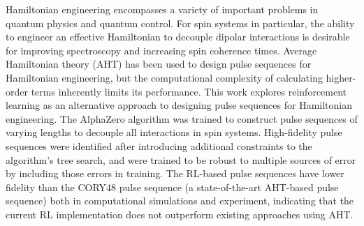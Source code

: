 

%
%
%
Hamiltonian engineering encompasses a variety of important problems in quantum physics and quantum control. For spin systems in particular, the ability to engineer an effective Hamiltonian to decouple dipolar interactions is desirable for improving spectroscopy and increasing spin coherence times.
Average Hamiltonian theory (AHT) has been used to design pulse sequences for Hamiltonian engineering, but the computational complexity of calculating higher-order terms inherently limits its performance.
This work explores reinforcement learning as an alternative approach to designing pulse sequences for Hamiltonian engineering. The AlphaZero algorithm was trained to construct pulse sequences of varying lengths to decouple all interactions in spin systems. High-fidelity pulse sequences were identified after introducing additional constraints to the algorithm's tree search, and were trained to be robust to multiple sources of error by including those errors in training.
The RL-based pulse sequences have lower fidelity than the CORY48 pulse sequence (a state-of-the-art AHT-based pulse sequence) both in computational simulations and experiment, indicating that the current RL implementation does not outperform existing approaches using AHT.

